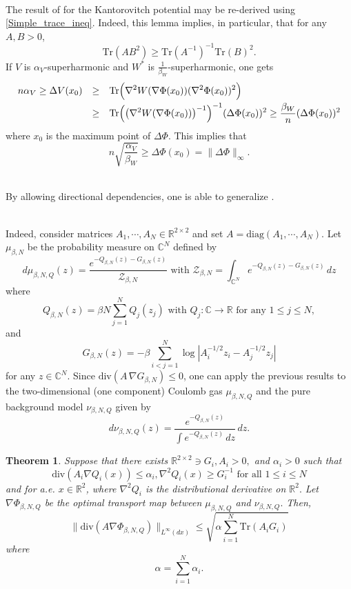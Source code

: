 \documentclass[11pt,a4paper,reqno]{amsart}
\numberwithin{equation}{section}
\newtheorem{theorem}{Theorem}[section]
\theoremstyle{definition}
\newcommand{\nm}{\noalign{\smallskip}}
\newcommand{\ds}{\displaystyle}
\newcommand{\<}{\ensuremath \leq}
\renewcommand{\>}{\ensuremath \geq}
\begin{document}
\hfill \\

The result of \cite[Thm 6.3]{Gozlan} for the Kantorovitch potential may be re-derived using \cref{Simple_trace_ineq}. Indeed, this lemma implies, in particular, that for any $A,B>0$, $$\mathrm{Tr}(AB^2) \geq \mathrm{Tr}(A^{-1})^{-1}\mathrm{Tr}(B)^2.$$ If $V$ is $\alpha_V$-superharmonic and $W^*$ is $\frac{1}{\beta_W}$-superharmonic, one gets $$\begin{array}{lll}
\ds n\alpha_V \geq \Delta V(x_0) &\geq& \ds \mathrm{Tr}\Bigl(\nabla^2 W(\nabla \Phi(x_0))(\nabla^2 \Phi(x_0))^2\Bigl) \\
\nm 
&\geq& \ds \mathrm{Tr}\Bigl( \bigl(\nabla^2 W(\nabla \Phi (x_0))\bigl)^{-1}\Bigl)^{-1}(\Delta \Phi(x_0))^2 \geq \frac{\beta_W}{n}(\Delta \Phi(x_0))^2
\end{array}$$ where $x_0$ is the maximum point of $\Delta \Phi.$ This implies that $$n\sqrt{\frac{\alpha_V}{\beta_W}} \geq \Delta \Phi(x_0) =\|\Delta \Phi\|_\infty.$$ 

\hfill \\ 

By allowing directional dependencies, one is able to generalize \cite[Thm 1.18]{Guido}.

\hfill \\

Indeed, consider matrices $A_1,\cdots,A_N \in \mathbb{R}^{2 \times 2}$ and set $A=\mathrm{diag}(A_1,\cdots,A_N).$
Let $\mu_{\beta,N}$ be the probability measure on $\mathbb{C}^N$ defined by $$d\mu_{\beta,N,Q}(z)=\frac{e^{-Q_{\beta,N}(z)-G_{\beta,N}(z)}}{\mathcal{Z}_{\beta,N}} \text{ with } \mathcal{Z}_{\beta,N}=\int_{\mathbb{C}^N}e^{-Q_{\beta,N}(z)-G_{\beta,N}(z)}\, dz$$ where $$Q_{\beta,N}(z)=\beta N\sum_{j=1}^N Q_j(z_j) \text{ with } Q_j: \mathbb{C} \rightarrow \mathbb{R} \text{ for any } 1 \leq j \leq N,$$ and $$G_{\beta,N}(z)=-\beta \sum_{i<j=1}^N \log |A_i^{-1/2}z_i-A_j^{-1/2}z_j|$$ for any $z \in \mathbb{C}^N.$ Since $\mathrm{div}(A\, \nabla G_{\beta,N}) \leq 0$, one can apply the previous results to the two-dimensional (one component) Coulomb gas $\mu_{\beta,N,Q}$ and the pure background model $\nu_{\beta,N,Q}$ given by $$d\nu_{\beta,N,Q}(z)=\frac{e^{-Q_{\beta,N}(z)}}{\int e^{-Q_{\beta,N}(z)}\, dz}\, dz.$$ 

\begin{theorem}
    Suppose that there exists $\mathbb{R}^{2 \times 2} \ni G_i,A_i>0,$ and $\alpha_i>0$ such that $$\mathrm{div}(A_i\nabla Q_i(x)) \leq \alpha_i, \nabla^2 Q_i(x) \geq G_i^{-1} \text{ for all } 1 \leq i \leq N$$ and for a.e. $x \in \mathbb{R}^2$, where $\nabla^2 Q_i$ is the distributional derivative on $\mathbb{R}^2.$ Let $\nabla \Phi_{\beta,N,Q}$ be the optimal transport map between $\mu_{\beta,N,Q}$ and $\nu_{\beta,N,Q}.$ Then, $$\|\mathrm{div}(A\nabla \Phi_{\beta,N,Q})\|_{L^\infty(dx)} \leq \sqrt{\alpha \sum_{i=1}^N \mathrm{Tr}(A_iG_i)}$$ where $$\alpha=\sum_{i=1}^N \alpha_i.$$
\end{theorem}
\end{document}

